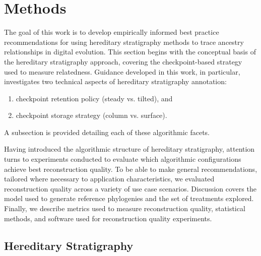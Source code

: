 \section{Methods} \label{sec:methods}

The goal of this work is to develop empirically informed best practice recommendations for using hereditary stratigraphy methods to trace ancestry relationships in digital evolution.
This section begins with the conceptual basis of the hereditary stratigraphy approach, covering the checkpoint-based strategy used to measure relatedness.
Guidance developed in this work, in particular, investigates two technical aspects of hereditary stratigraphy annotation:
\begin{enumerate}
\item checkpoint retention policy (steady vs. tilted), and
\item checkpoint storage strategy (column vs. surface).
\end{enumerate}
A subsection is provided detailing each of these algorithmic facets.

Having introduced the algorithmic structure of hereditary stratigraphy, attention turns to experiments conducted to evaluate which algorithmic configurations achieve best reconstruction quality.
To be able to make general recommendations, tailored where necessary to application characteristics, we evaluated reconstruction quality across a variety of use case scenarios.
Discussion covers the model used to generate reference phylogenies and the set of treatments explored.
Finally, we describe metrics used to measure reconstruction quality, statistical methods, and software used for reconstruction quality experiments.

\subsection{Hereditary Stratigraphy}

